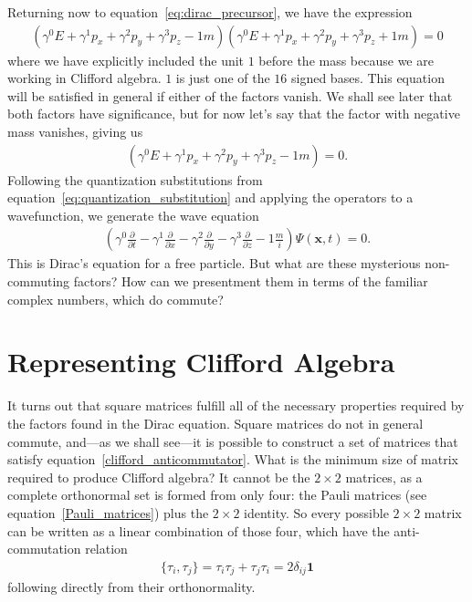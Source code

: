 \documentclass[titlepage,letterpaper,onecolumn,11pt,final]{report}
\newcommand{\psxt}{\Psi (\mathbf{x},t)}
\newcommand{\gama}{\gamma^{0}}
\newcommand{\gamb}{\gamma^{1}}
\newcommand{\gamc}{\gamma^{2}}
\newcommand{\gamd}{\gamma^{3}}
\numberwithin{equation}{section}
\numberwithin{figure}{section}
\begin{document}
Returning now to equation~\ref{eq:dirac_precursor}, we have the expression
\begin{gather}
	\label{eq:dirac_precursor_less}
	\left(  \gama E + \gamb p_{x} + \gamc p_{y} + \gamd p_{z} - 1 m \right) \left( \gama E + \gamb p_{x} + \gamc p_{y} + \gamd p_{z} + 1 m \right) = 0
\end{gather}
%
where we have explicitly included the unit $1$ before the mass because we are working in Clifford algebra. $1$ is just one of the $16$ signed bases. This equation will be satisfied in general if either of the factors vanish. We shall see later that both factors have significance, but for now let's say that the factor with negative mass vanishes, giving us
\begin{gather}
	\left(  \gama E + \gamb p_{x} + \gamc p_{y} + \gamd p_{z} - 1 m \right) = 0.
\end{gather}
%
Following the quantization substitutions from equation~\ref{eq:quantization_substitution} and applying the operators to a wavefunction, we generate the wave equation
\begin{gather}
	\label{eq:dirac_equation}
	\left(  \gama \frac{\partial}{\partial t} - \gamb \frac{\partial}{\partial x} - \gamc \frac{\partial}{\partial y} - \gamd \frac{\partial}{\partial z} - 1 \frac{m}{i} \right) \psxt = 0 .
\end{gather}
This is Dirac's equation for a free particle. But what are these mysterious non-commuting factors? How can we presentment them in terms of the familiar complex numbers, which do commute? 

\section{Representing Clifford Algebra}

It turns out that square matrices fulfill all of the necessary properties required by the factors found in the Dirac equation. Square matrices do not in general commute, and---as we shall see---it is possible to construct a set of matrices that satisfy equation~\ref{clifford_anticommutator}. What is the minimum size of matrix required to produce Clifford algebra? It cannot be the $2 \times 2$ matrices, as a complete orthonormal set is formed from only four: the Pauli matrices (see equation~\ref{Pauli_matrices}) plus the $2 \times 2$ identity. So every possible $2 \times 2$ matrix can be written as a linear combination of those four, which have the anti-commutation relation
\begin{gather}
	\label{eq:pauli_anticommutator}
	\{ \tau_{i},\tau_{j} \} = \tau_{i} \tau_{j} + \tau_{j} \tau_{i} = 2 \delta_{ij} \mathbf{1}
\end{gather}
%
following directly from their orthonormality.
\end{document}
